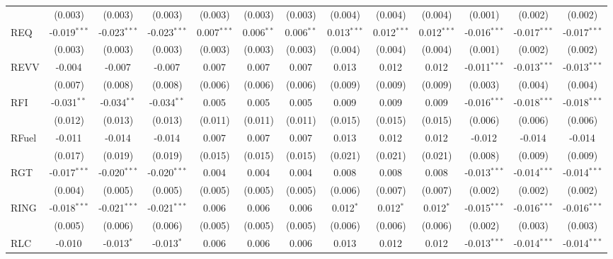 \begin{table}[!htbp]
\begin{tabular}{@{\extracolsep{5pt}}lcccccccccccc}
  & (0.003) & (0.003) & (0.003) & (0.003) & (0.003) & (0.003) & (0.004) & (0.004) & (0.004) & (0.001) & (0.002) & (0.002) \\
 REQ & -0.019$^{***}$ & -0.023$^{***}$ & -0.023$^{***}$ & 0.007$^{***}$ & 0.006$^{**}$ & 0.006$^{**}$ & 0.013$^{***}$ & 0.012$^{***}$ & 0.012$^{***}$ & -0.016$^{***}$ & -0.017$^{***}$ & -0.017$^{***}$ \\
  & (0.003) & (0.003) & (0.003) & (0.003) & (0.003) & (0.003) & (0.004) & (0.004) & (0.004) & (0.001) & (0.002) & (0.002) \\
 REVV & -0.004$^{}$ & -0.007$^{}$ & -0.007$^{}$ & 0.007$^{}$ & 0.007$^{}$ & 0.007$^{}$ & 0.013$^{}$ & 0.012$^{}$ & 0.012$^{}$ & -0.011$^{***}$ & -0.013$^{***}$ & -0.013$^{***}$ \\
  & (0.007) & (0.008) & (0.008) & (0.006) & (0.006) & (0.006) & (0.009) & (0.009) & (0.009) & (0.003) & (0.004) & (0.004) \\
 RFI & -0.031$^{**}$ & -0.034$^{**}$ & -0.034$^{**}$ & 0.005$^{}$ & 0.005$^{}$ & 0.005$^{}$ & 0.009$^{}$ & 0.009$^{}$ & 0.009$^{}$ & -0.016$^{***}$ & -0.018$^{***}$ & -0.018$^{***}$ \\
  & (0.012) & (0.013) & (0.013) & (0.011) & (0.011) & (0.011) & (0.015) & (0.015) & (0.015) & (0.006) & (0.006) & (0.006) \\
 RFuel & -0.011$^{}$ & -0.014$^{}$ & -0.014$^{}$ & 0.007$^{}$ & 0.007$^{}$ & 0.007$^{}$ & 0.013$^{}$ & 0.012$^{}$ & 0.012$^{}$ & -0.012$^{}$ & -0.014$^{}$ & -0.014$^{}$ \\
  & (0.017) & (0.019) & (0.019) & (0.015) & (0.015) & (0.015) & (0.021) & (0.021) & (0.021) & (0.008) & (0.009) & (0.009) \\
 RGT & -0.017$^{***}$ & -0.020$^{***}$ & -0.020$^{***}$ & 0.004$^{}$ & 0.004$^{}$ & 0.004$^{}$ & 0.008$^{}$ & 0.008$^{}$ & 0.008$^{}$ & -0.013$^{***}$ & -0.014$^{***}$ & -0.014$^{***}$ \\
  & (0.004) & (0.005) & (0.005) & (0.005) & (0.005) & (0.005) & (0.006) & (0.007) & (0.007) & (0.002) & (0.002) & (0.002) \\
 RING & -0.018$^{***}$ & -0.021$^{***}$ & -0.021$^{***}$ & 0.006$^{}$ & 0.006$^{}$ & 0.006$^{}$ & 0.012$^{*}$ & 0.012$^{*}$ & 0.012$^{*}$ & -0.015$^{***}$ & -0.016$^{***}$ & -0.016$^{***}$ \\
  & (0.005) & (0.006) & (0.006) & (0.005) & (0.005) & (0.005) & (0.006) & (0.006) & (0.006) & (0.002) & (0.003) & (0.003) \\
 RLC & -0.010$^{}$ & -0.013$^{*}$ & -0.013$^{*}$ & 0.006$^{}$ & 0.006$^{}$ & 0.006$^{}$ & 0.013$^{}$ & 0.012$^{}$ & 0.012$^{}$ & -0.013$^{***}$ & -0.014$^{***}$ & -0.014$^{***}$ \\

\end{tabular}
\end{table}
